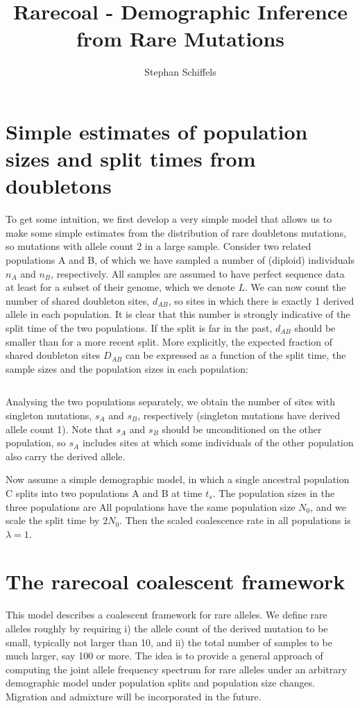 \documentclass[a4paper]{article}
\begin{document}
\title{Rarecoal - Demographic Inference from Rare Mutations}
\author{Stephan Schiffels}
\date{}
\maketitle

\section{Simple estimates of population sizes and split times from doubletons}
To get some intuition, we first develop a very simple model that allows us to make some simple estimates from the distribution of rare doubletons mutations, so mutations with allele count 2 in a large sample. Consider two related populations A and B, of which we have sampled a number of (diploid) individuals $n_A$ and $n_B$, respectively. All samples are assumed to have perfect sequence data at least for a subset of their genome, which we denote $L$. We can now count the number of shared doubleton sites, $d_{AB}$, so sites in which there is exactly 1 derived allele in each population. It is clear that this number is strongly indicative of the split time of the two populations. If the split is far in the past, $d_{AB}$ should be smaller than for a more recent split. More explicitly, the expected fraction of shared doubleton sites $D_{AB}$ can be expressed as a function of the split time, the sample sizes and the population sizes in each population:

\[
    
\]


Analysing the two populations separately, we obtain the number of sites with singleton mutations, $s_A$ and $s_B$, respectively (singleton mutations have derived allele count 1). Note that $s_A$ and $s_B$ should be unconditioned on the other population, so $s_A$ includes sites at which some individuals of the other population also carry the derived allele.



Now assume a simple demographic model, in which a single ancestral population C splits into two populations A and B at time $t_s$. The population sizes in the three populations are All populations have the same population size $N_0$, and we scale the split time by $2N_0$. Then the scaled coalescence rate in all populations is $\lambda=1$. 


\section*{The rarecoal coalescent framework}
This model describes a coalescent framework for rare alleles. We define rare alleles roughly by requiring i) the allele count of the derived mutation to be small, typically not larger than 10, and ii) the total number of samples to be much larger, say 100 or more. The idea is to provide a general approach of computing the joint allele frequency spectrum for rare alleles under an arbitrary demographic model under population splits and population size changes. Migration and admixture will be incorporated in the future.
\end{document}
